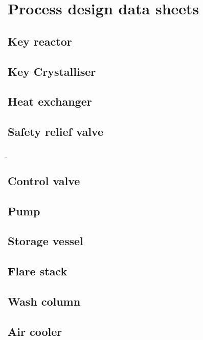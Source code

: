 \section{Process design data sheets}

\subsection{Key reactor}

\subsection{Key Crystalliser}

\subsection{Heat exchanger}

\subsection{Safety relief valve}

\b

\subsection{Control valve}

\subsection{Pump}

\subsection{Storage vessel}

\subsection{Flare stack}

\subsection{Wash column}

\subsection{Air cooler}



